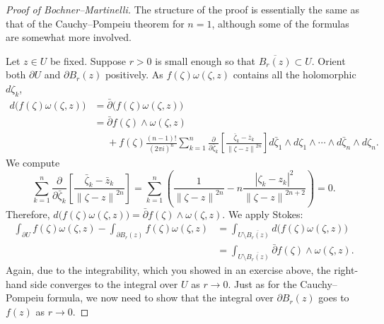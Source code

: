 \documentclass[12pt,openany]{book}
\newcommand{\abs}[1]{\left\lvert {#1} \right\rvert}
\newcommand{\norm}[1]{\left\lVert {#1} \right\rVert}
\theoremstyle{plain}
\theoremstyle{remark}
\theoremstyle{definition}
\theoremstyle{exercise}
\theoremstyle{example}
\begin{document}
\begin{proof}[Proof of Bochner--Martinelli]
The structure of the proof is essentially the same as that of
the Cauchy--Pompeiu theorem for $n=1$, although some of the formulas are somewhat
more involved.

Let $z \in U$ be fixed.  Suppose $r > 0$ is small enough so that
$\overline{B_r(z)} \subset U$.  Orient both
$\partial U$ and $\partial B_r(z)$
positively.  As
$f(\zeta) \omega(\zeta,z)$ contains all the holomorphic $d\zeta_k$,
\begin{equation*}
\begin{split}
d \bigl( f(\zeta) \omega(\zeta,z) \bigr)
& =
\bar{\partial} \bigl( f(\zeta) \omega(\zeta,z) \bigr)
\\
& =
\bar{\partial} f(\zeta) \wedge \omega(\zeta,z)
\\
& \phantom{=} +
f(\zeta)
\frac{(n-1)!}{{(2\pi i)}^n}
\sum_{k=1}^n
\frac{\partial}{\partial \bar{\zeta}_k} \left[
\frac{\bar{\zeta}_k-\bar{z}_k}{\norm{\zeta-z}^{2n}}
\right]
d\bar{\zeta}_1 \wedge d\zeta_1 \wedge
\cdots \wedge
d\bar{\zeta}_n \wedge d\zeta_n .
\end{split}
\end{equation*}
We compute
\begin{equation*}
\sum_{k=1}^n
\frac{\partial}{\partial \bar{\zeta}_k}
\left[
\frac{\bar{\zeta}_k-\bar{z}_k}{\norm{\zeta-z}^{2n}}
\right]
=
\sum_{k=1}^n
\left(
\frac{1}{\norm{\zeta-z}^{2n}}
-n
\frac{\abs{\zeta_k-z_k}^2}{\norm{\zeta-z}^{2n+2}}
\right)
= 0 .
\end{equation*}
Therefore,
$d \bigl( f(\zeta) \omega(\zeta,z) \bigr) = \bar{\partial} f(\zeta) \wedge
\omega(\zeta,z)$.
We apply Stokes:
\begin{equation*}
\begin{split}
\int_{\partial U}
f(\zeta) \omega(\zeta,z)
-
\int_{\partial B_r(z)}
f(\zeta) \omega(\zeta,z)
& =
\int_{U \setminus \overline{B_r(z)}}
d \bigl( f(\zeta) \omega(\zeta,z) \bigr)
\\
& =
\int_{U \setminus \overline{B_r(z)}}
\bar{\partial} f(\zeta) \wedge \omega(\zeta,z) .
\end{split}
\end{equation*}
Again, due to the integrability, which you showed in an exercise above,
the right-hand side converges to the integral over $U$ as $r \to 0$.
Just as for the Cauchy--Pompeiu formula, we now need to show that the integral
over $\partial B_r(z)$ goes to $f(z)$ as $r \to 0$.


\end{proof}
\end{document}
